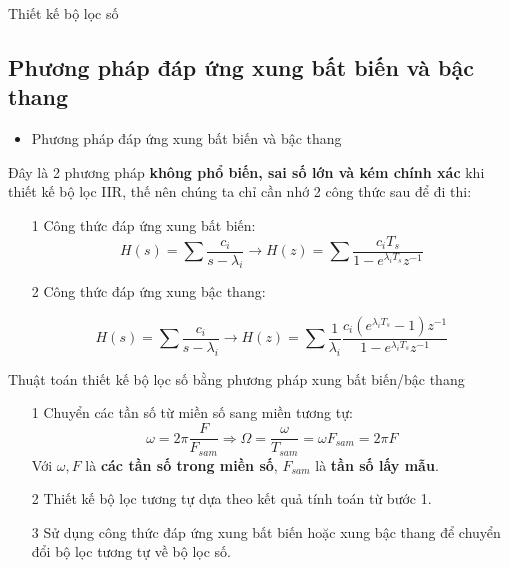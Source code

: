 \documentclass[8pt]{beamer}
\begin{document}
\begin{frame}{Thiết kế bộ lọc số}
\subsection{Phương pháp đáp ứng xung bất biến và bậc thang}
\begin{itemize}
	\item Phương pháp đáp ứng xung bất biến và bậc thang
\end{itemize}
Đây là 2 phương pháp \textbf{không phổ biến, sai số lớn và kém chính xác} khi thiết kế bộ lọc IIR, thế nên chúng ta chỉ cần nhớ 2 công thức sau để đi thi:
\begin{enumerate}
	\item[1] Công thức đáp ứng xung bất biến:
		$$H(s)=\sum\frac{c_{i}}{s-\lambda_{i}}\to H(z)=\sum\frac{c_{i}T_{s}}{1-e^{\lambda_{i}T_{s}}z^{-1}}$$
	\item[2] Công thức đáp ứng xung bậc thang:

		$$H(s)=\sum\frac{c_{i}}{s-\lambda_{i}}\to H(z)=\sum\frac{1}{\lambda_{i}}\frac{c_{i}(e^{\lambda_{i}T_{s}}-1)z^{-1}}{1-e^{\lambda_{i}T_{s}}z^{-1}}$$
\end{enumerate}
\begin{block}{Thuật toán thiết kế bộ lọc số bằng phương pháp xung bất biến/bậc thang}
\begin{enumerate}
	\item[1] Chuyển các tần số từ miền số sang miền tương tự:
		$$\omega=2\pi\frac{F}{F_{sam}}
		\Rightarrow\Omega=\frac{\omega}{T_{sam}}=\omega F_{sam}=2\pi F$$
	Với $\omega,F$ là \textbf{các tần số trong miền số}, $F_{sam}$ là \textbf{tần số lấy mẫu}.
	\item[2] Thiết kế bộ lọc tương tự dựa theo kết quả tính toán từ bước 1.
	\item[3] Sử dụng công thức đáp ứng xung bất biến hoặc xung bậc thang để chuyển đổi bộ lọc tương tự về bộ lọc số.
\end{enumerate}
\end{block}
\end{frame}
\end{document}
